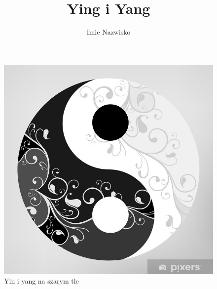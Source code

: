 \documentclass[a4paper, 12pt]{amsart}
\author{Imie Nazwisko}
\title{Ying i Yang}
\begin{document}
\maketitle


\begin{figure}[h]

\includegraphics[scale=0.5]{yingyang}
\caption{Yin i yang na szarym tle}
\centering
\end{figure}
\end{document}
